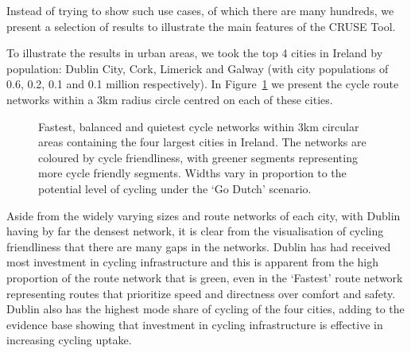\documentclass[
  super,
  preprint,
  3p]{elsarticle}
\begin{document}
Instead of trying to show such use cases, of which there are many
hundreds, we present a selection of results to illustrate the main
features of the CRUSE Tool.

To illustrate the results in urban areas, we took the top 4 cities in
Ireland by population: Dublin City, Cork, Limerick and Galway (with city
populations of 0.6, 0.2, 0.1 and 0.1 million respectively). In
Figure~\ref{fig-city-results} we present the cycle route networks within
a 3km radius circle centred on each of these cities.

\begin{figure}


\caption{\label{fig-city-results}Fastest, balanced and quietest cycle
networks within 3km circular areas containing the four largest cities in
Ireland. The networks are coloured by cycle friendliness, with greener
segments representing more cycle friendly segments. Widths vary in
proportion to the potential level of cycling under the `Go Dutch'
scenario.}

\end{figure}%

Aside from the widely varying sizes and route networks of each city,
with Dublin having by far the densest network, it is clear from the
visualisation of cycling friendliness that there are many gaps in the
networks. Dublin has had received most investment in cycling
infrastructure and this is apparent from the high proportion of the
route network that is green, even in the `Fastest' route network
representing routes that prioritize speed and directness over comfort
and safety. Dublin also has the highest mode share of cycling of the
four cities, adding to the evidence base showing that investment in
cycling infrastructure is effective in increasing cycling uptake.
\end{document}
